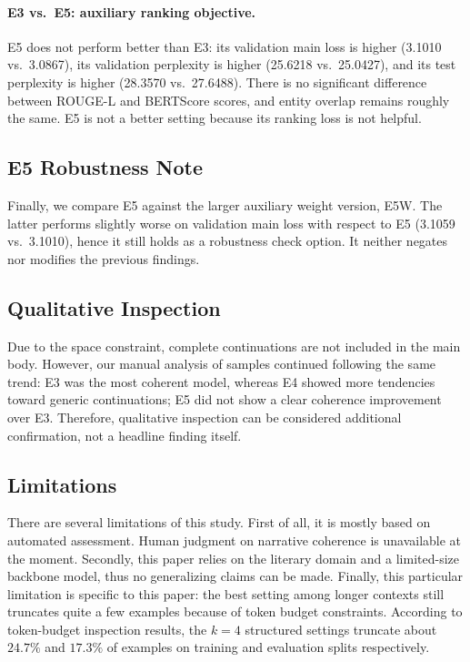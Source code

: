 \documentclass{article}
\newcommand{\expid}[1]{\textsc{#1}}
\begin{document}
\paragraph{\expid{E3} vs.\ \expid{E5}: auxiliary ranking objective.}
\expid{E5} does not perform better than \expid{E3}: its validation main loss is higher (3.1010 vs.\ 3.0867), its validation perplexity is higher (25.6218 vs.\ 25.0427), and its test perplexity is higher (28.3570 vs.\ 27.6488). There is no significant difference between ROUGE-L and BERTScore scores, and entity overlap remains roughly the same. \expid{E5} is not a better setting because its ranking loss is not helpful.

\subsection{\expid{E5} Robustness Note}

Finally, we compare \expid{E5} against the larger auxiliary weight version, \expid{E5W}. The latter performs slightly worse on validation main loss with respect to \expid{E5} (3.1059 vs.\ 3.1010), hence it still holds as a robustness check option. It neither negates nor modifies the previous findings.

\subsection{Qualitative Inspection}

Due to the space constraint, complete continuations are not included in the main body. However, our manual analysis of samples continued following the same trend: \expid{E3} was the most coherent model, whereas \expid{E4} showed more tendencies toward generic continuations; \expid{E5} did not show a clear coherence improvement over \expid{E3}. Therefore, qualitative inspection can be considered additional confirmation, not a headline finding itself.

\subsection{Limitations}

There are several limitations of this study. First of all, it is mostly based on automated assessment. Human judgment on narrative coherence is unavailable at the moment. Secondly, this paper relies on the literary domain and a limited-size backbone model, thus no generalizing claims can be made. Finally, this particular limitation is specific to this paper: the best setting among longer contexts still truncates quite a few examples because of token budget constraints. According to token-budget inspection results, the $k=4$ structured settings truncate about $24.7\%$ and $17.3\%$ of examples on training and evaluation splits respectively.
\end{document}
